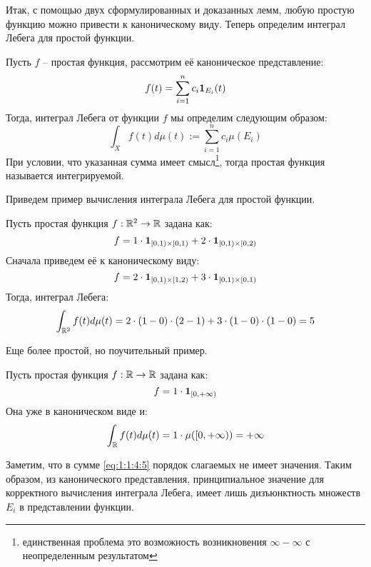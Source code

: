 \documentclass[../main.tex]{subfiles}
\begin{document}
Итак, с помощью двух сформулированных и доказанных лемм, любую простую функцию можно привести к каноническому виду. Теперь определим интеграл Лебега для простой функции.

\begin{definition}
	Пусть $f$ -- простая функция, рассмотрим её каноническое представление:
	\begin{equation*}
		f(t) = \sum_{i=1}^{n}{c_i \mathbf{1}_{E_i} (t)}
	\end{equation*}
	Тогда, интеграл Лебега от функции $f$ мы определим следующим образом:
	\begin{equation}\label{eq:1:1:4:5}
		\int_{X}{f (t) d\mu (t)} := \sum_{i=1}^{n}{c_i \mu (E_i)}
	\end{equation} 
	При условии, что указанная сумма имеет смысл\footnote{единственная проблема это возможность возникновения $\infty - \infty$ с неопределенным результатом}, тогда простая функция называется интегрируемой.
\end{definition}

Приведем пример вычисления интеграла Лебега для простой функции.
\begin{example}
	Пусть простая функция $f: \mathbb{R}^2 \to \mathbb{R}$ задана как:
	$$f = 1 \cdot \mathbf{1}_{[0, 1) \times [0, 1)} + 2 \cdot \mathbf{1}_{[0, 1) \times [0, 2)}$$
	Сначала приведем её к каноническому виду:
	$$f = 2 \cdot \mathbf{1}_{[0, 1) \times [1, 2)} + 3 \cdot \mathbf{1}_{[0, 1) \times [0, 1)}$$ 
	Тогда, интеграл Лебега:
	$$\int_{\mathbb{R}^2}{f(t) d\mu(t)} = 2 \cdot (1 - 0) \cdot (2 - 1) + 3 \cdot (1 - 0) \cdot (1 - 0) = 5$$
\end{example}

Еще более простой, но поучительный пример.
\begin{example}
	Пусть простая функция $f : \mathbb{R} \to \mathbb{R}$ задана как:
	$$f = 1 \cdot \mathbf{1}_{[0, +\infty)}$$
	Она уже в каноническом виде и:
	$$\int_{\mathbb{R}}{f(t) d\mu(t)} = 1 \cdot \mu([0, +\infty)) = +\infty$$
\end{example}

Заметим, что в сумме \eqref{eq:1:1:4:5} порядок слагаемых не имеет значения. Таким образом, из канонического представления, принципиальное значение для корректного вычисления интеграла Лебега, имеет лишь дизъюнктность множеств $E_i$ в представлении функции. 
\end{document}
